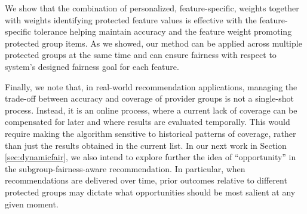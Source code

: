 We show that the combination of personalized, feature-specific, weights together with weights identifying protected feature values is effective with the feature-specific tolerance helping maintain accuracy and the feature weight promoting protected group items. As we showed, our method can be applied across multiple protected groups at the same time and can ensure fairness with respect to system's designed fairness goal for each feature.






Finally, we note that, in real-world recommendation applications, managing the trade-off between accuracy and coverage of provider groups is not a single-shot process. Instead, it is an online process, where a current lack of coverage can be compensated for later and where results are evaluated temporally. This would require making the algorithm sensitive to historical patterns of coverage, rather than just the results obtained in the current list. In our next work in Section \ref{sec:dynamicfair}, we also intend to explore further the idea of ``opportunity'' in the subgroup-fairness-aware recommendation. In particular, when recommendations are delivered over time, prior outcomes relative to different protected groups may dictate what opportunities should be most salient at any given moment. 

